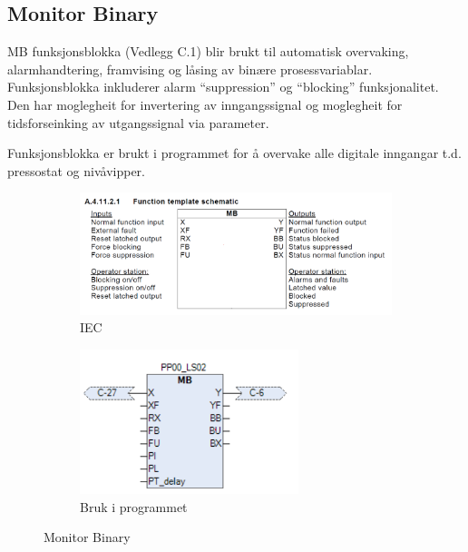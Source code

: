 
\newpage

\subsection{Monitor Binary}
\gls{MB} funksjonsblokka (Vedlegg C.1) blir brukt til automatisk overvaking, alarmhandtering, framvising og låsing av binære prosessvariablar.
Funksjonsblokka inkluderer alarm ``suppression'' og ``blocking'' funksjonalitet. Den har moglegheit for invertering av 
inngangssignal og moglegheit for tidsforseinking av utgangssignal via parameter.

Funksjonsblokka er brukt i programmet for å overvake alle digitale inngangar t.d. pressostat og nivåvipper.


\begin{figure}[htbp]
    \centering
    \begin{subfigure}[b]{0.45\textwidth}
        \centering
        \includegraphics[width=1\textwidth]{Bilder/MBBlokkIEC.png}
        \caption{IEC}\label{fig:Monitor Binary blokk IEC}
    \end{subfigure}
    \hfill
    \begin{subfigure}[b]{0.45\textwidth}
        \centering
        \includegraphics[width=0.7\textwidth]{Bilder/MBBlokkIProgrammet.png}
        \caption{Bruk i programmet}\label{fig:Monitor Binary blokk i programmet}
    \end{subfigure}
    \caption{Monitor Binary}\label{fig:Monitor Binary}
\end{figure}

